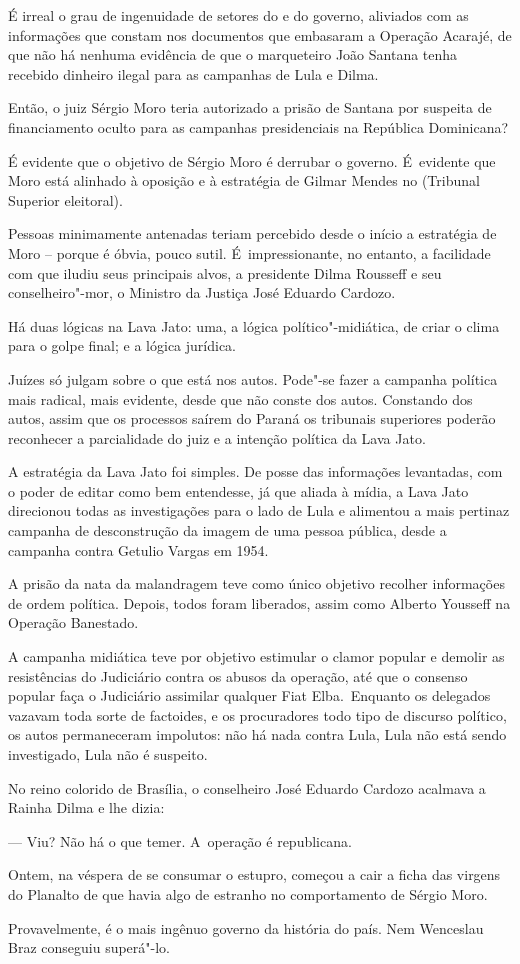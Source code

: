  

É irreal o grau de ingenuidade de setores do  e do governo, aliviados
com as informações que constam nos documentos que embasaram a Operação
Acarajé, de que não há nenhuma evidência de que o marqueteiro João
Santana tenha recebido dinheiro ilegal para as campanhas de Lula e
Dilma.

Então, o juiz Sérgio Moro teria autorizado a prisão de Santana por
suspeita de financiamento oculto para as campanhas presidenciais na
República Dominicana?

É evidente que o objetivo de Sérgio Moro é derrubar o governo. É~evidente que Moro está alinhado à oposição e à estratégia de Gilmar
Mendes no  (Tribunal Superior eleitoral).

Pessoas minimamente antenadas teriam percebido desde o início a
estratégia de Moro -- porque é óbvia, pouco sutil. É~impressionante, no
entanto, a facilidade com que iludiu seus principais alvos, a presidente
Dilma Rousseff e seu conselheiro"-mor, o Ministro da Justiça José Eduardo
Cardozo.

Há duas lógicas na Lava Jato: uma, a lógica político"-midiática, de criar
o clima para o golpe final; e a lógica jurídica.

Juízes só julgam sobre o que está nos autos. Pode"-se fazer a campanha
política mais radical, mais evidente, desde que não conste dos autos.
Constando dos autos, assim que os processos saírem do Paraná os
tribunais superiores poderão reconhecer a parcialidade do juiz e a
intenção política da Lava Jato.

A estratégia da Lava Jato foi simples. De posse das informações
levantadas, com o poder de editar como bem entendesse, já que aliada à
mídia, a Lava Jato direcionou todas as investigações para o lado de Lula
e alimentou a mais pertinaz campanha de desconstrução da imagem de uma
pessoa pública, desde a campanha contra Getulio Vargas em 1954.

A prisão da nata da malandragem teve como único objetivo recolher
informações de ordem política. Depois, todos foram liberados, assim como
Alberto Yousseff na Operação Banestado.

A campanha midiática teve por objetivo estimular o clamor popular e
demolir as resistências do Judiciário contra os abusos da operação, até
que o consenso popular faça o Judiciário assimilar qualquer Fiat
Elba.~Enquanto os delegados vazavam toda sorte de factoides, e os
procuradores todo tipo de discurso político, os autos permaneceram
impolutos: não há nada contra Lula, Lula não está sendo investigado,
Lula não é suspeito.

No reino colorido de Brasília, o conselheiro José Eduardo Cardozo
acalmava a Rainha Dilma e lhe dizia:

— Viu? Não há o que temer. A~operação é republicana.

Ontem, na véspera de se consumar o estupro, começou a cair a ficha das
virgens do Planalto de que havia algo de estranho no comportamento de
Sérgio Moro.

Provavelmente, é o mais ingênuo governo da história do país. Nem
Wenceslau Braz conseguiu superá"-lo.
